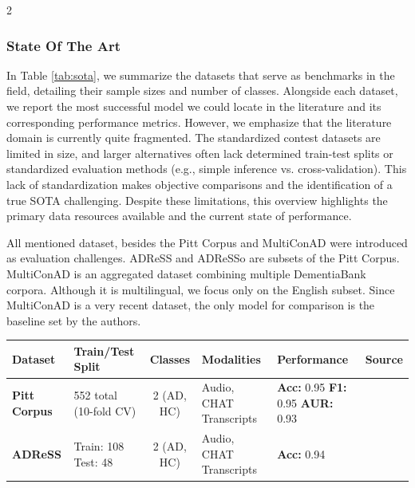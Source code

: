\documentclass[10pt]{article}
\begin{document}
\begin{multicols}{2}
\subsubsection{State Of The Art}
\par In Table \ref{tab:sota}, we summarize the datasets that serve as
benchmarks in the field, detailing their sample sizes and number of classes.
Alongside each dataset, we report the most successful model we could locate in the
literature and its corresponding performance metrics. However, we emphasize
that the literature domain is currently quite fragmented. The standardized
contest datasets are limited in size, and larger alternatives often lack
determined train-test splits or standardized evaluation methods (e.g., simple
inference vs. cross-validation). This lack of standardization makes objective
comparisons and the identification of a true SOTA challenging. Despite these
limitations, this overview highlights the primary data resources available and
the current state of performance.
\par All mentioned dataset, besides the Pitt Corpus and MultiConAD were
introduced as evaluation challenges. ADReSS and ADReSSo are subsets of the Pitt
Corpus. MultiConAD is an aggregated dataset combining multiple DementiaBank
corpora. Although it is multilingual, we focus only on the English subset.
Since MultiConAD is a very recent dataset, the only model for comparison is the
baseline set by the authors.

\begin{table}[htbp]
\centering
\begin{tabular}{@{}p{2.5cm} p{2.2cm} cp{2.8cm} p{2.5cm} p{2.5cm}@{}}
\toprule
\textbf{Dataset} & \textbf{Train/Test Split} & \textbf{Classes} &
\textbf{Modalities} & \textbf{Performance} & \textbf{Source} \\
\midrule

\textbf{Pitt Corpus} & 552 total (10-fold CV) & 2 (AD, HC) &
Audio, \newline CHAT Transcripts & \textbf{Acc:} 0.95 \newline \textbf{F1:} 0.95 
\newline \textbf{AUR:} 0.93 &
\cite{latifDeepEnsembleLearning2025} \\
\midrule

\textbf{ADReSS} & Train: 108 \newline Test: 48 & 2 (AD, HC) & Audio, \newline CHAT Transcripts &
\textbf{Acc:} 0.94  \newline &
\cite{martincTemporalIntegrationText2021} \\
\midrule


\end{tabular}
\end{table}
\end{multicols}
\end{document}
